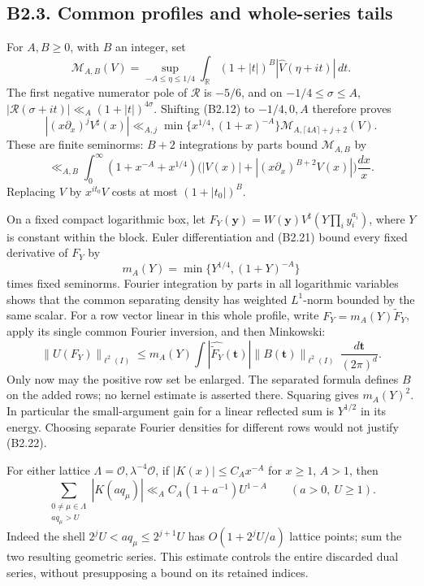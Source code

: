\documentclass[11pt,a4paper]{article}
\begin{document}
\hypertarget{b2.3.-common-profiles-and-whole-series-tails}{%
\subsection{B2.3. Common profiles and whole-series
tails}\label{b2.3.-common-profiles-and-whole-series-tails}}

For \(A,\allowbreak{}B\ge0\), with \(B\) an integer, set \[
\mathcal M_{A,B}(V)=
\sup_{-A\le\eta\le1/4}\int_{\mathbb R}
(1+|t|)^B|\widehat V(\eta+it)|\,dt.
\] The first negative numerator pole of \(\mathcal R\) is \(-5/6\), and
on \(-1/4\le\sigma\le A\),
\(|\mathcal R(\sigma+it)|\ll_A(1+|t|)^{4\sigma}\). Shifting (B2.12) to
\(-1/4,\allowbreak{}0,\allowbreak{}A\) therefore proves \[
|(x\partial_x)^jV^\sharp(x)|
\ll_{A,j}\min\{x^{1/4},(1+x)^{-A}\}
\mathcal M_{A,\lceil4A\rceil+j+2}(V).
\tag{B2.21}
\] These are finite seminorms: \(B+2\) integrations by parts bound
\(\mathcal M_{A,\allowbreak{}B}\) by \[
\ll_{A,B}\int_0^\infty
(1+x^{-A}+x^{1/4})\bigl(|V(x)|+|(x\partial_x)^{B+2}V(x)|\bigr)\frac{dx}{x}.
\] Replacing \(V\) by \(x^{it_0}V\) costs at most \((1+|t_0|)^B\).

On a fixed compact logarithmic box, let
\(F_Y(\mathbf y)=W(\mathbf y)V^\sharp(Y\prod_i y_i^{a_i})\), where \(Y\)
is constant within the block. Euler differentiation and (B2.21) bound
every fixed derivative of \(F_Y\) by \[
m_A(Y)=\min\{Y^{1/4},(1+Y)^{-A}\}
\] times fixed seminorms. Fourier integration by parts in all
logarithmic variables shows that the common separating density has
weighted \(L^1\)-norm bounded by the same scalar. For a row vector
linear in this whole profile, write \(F_Y=m_A(Y)\widetilde F_Y\), apply
its single common Fourier inversion, and then Minkowski: \[
\|U(F_Y)\|_{\ell^2(I)}
\le m_A(Y)\int |\widehat{\widetilde F_Y}(\mathbf t)|
\|B(\mathbf t)\|_{\ell^2(I)}\,\frac{d\mathbf t}{(2\pi)^d}.
\tag{B2.22}
\] Only now may the positive row set be enlarged. The separated formula
defines \(B\) on the added rows; no kernel estimate is asserted there.
Squaring gives \(m_A(Y)^2\). In particular the small-argument gain for a
linear reflected sum is \(Y^{1/2}\) in its energy. Choosing separate
Fourier densities for different rows would not justify (B2.22).

For either lattice \(\Lambda=\mathcal O,\allowbreak{}\lambda^{-4}\mathcal O\), if
\(|K(x)|\le C_Ax^{-A}\) for \(x\ge1\), \(A>1\), then \[
\sum_{\substack{0\ne\mu\in\Lambda\\a q_\mu>U}}|K(aq_\mu)|
\ll_A C_A(1+a^{-1})U^{1-A}\qquad(a>0,\ U\ge1).
\tag{B2.23}
\] Indeed the shell \(2^jU<aq_\mu\le2^{j+1}U\) has \(O(1+2^jU/a)\)
lattice points; sum the two resulting geometric series. This estimate
controls the entire discarded dual series, without presupposing a bound
on its retained indices.
\end{document}
